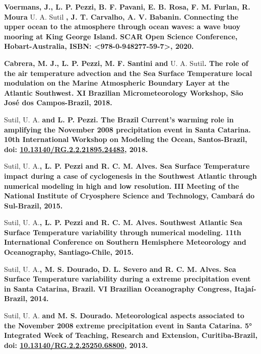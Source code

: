 \documentclass[letterpaper]{twentysecondcv} %
\begin{document}
\textbf{Voermans, J., L. P. Pezzi, B. F. Pavani, E. B. Rosa, F. M. Furlan, R. Moura} U. A. Sutil \textbf{, J. T. Carvalho, A. V. Babanin}\textbf{. Connecting the upper ocean to the atmosphere through ocean waves: a wave buoy mooring at King George Island. SCAR Open Science Conference, Hobart-Australia, ISBN: <978-0-948277-59-7>, 2020.} 

\textbf{Cabrera, M. J., L. P. Pezzi, M. F. Santini and} U. A. Sutil\textbf{. The role of the air temperature advection and the Sea Surface Temperature local modulation on the Marine Atmospheric Boundary Layer at the Atlantic Southwest. XI Brazilian Micrometeorology Workshop, São José dos Campos-Brazil, 2018.} 

Sutil, U. A.\textbf{ and L. P. Pezzi. The Brazil Current's warming role in amplifying the November 2008 precipitation event in Santa Catarina. 10th International Workshop on Modeling the Ocean, Santos-Brazil, doi: \textcolor{mainblue}{\href{https://www.researchgate.net/publication/329070547_Role_of_Brazil_Current_warming_in_amplifying_2008_Santa_Catarina_extreme_precipitation_event}{10.13140/RG.2.2.21895.24483}}, 2018.}

Sutil, U. A.\textbf{, L. P. Pezzi and R. C. M. Alves. Sea Surface Temperature impact during a case of cyclogenesis in the Southwest Atlantic through numerical modeling in high and low resolution. III Meeting of the National Institute of Cryosphere Science and Technology, Cambará do Sul-Brazil, 2015.}

Sutil, U. A.\textbf{, L. P. Pezzi and R. C. M. Alves. Southwest Atlantic Sea Surface Temperature variability through numerical modeling. 11th International Conference on Southern Hemisphere Meteorology and Oceanography, Santiago-Chile, 2015.}

Sutil, U. A.\textbf{, M. S. Dourado, D. L. Severo and R. C. M. Alves. Sea Surface Temperature variability during a extreme precipitation event in Santa Catarina, Brazil. VI Brazilian Oceanography Congress, Itajaí-Brazil, 2014.}

Sutil, U. A.\textbf{ and M. S. Dourado. Meteorological aspects associated to the November 2008 extreme precipitation event in Santa Catarina. 5° Integrated Week of Teaching, Research and Extension, Curitiba-Brazil, doi: \textcolor{mainblue}{\href{https://www.researchgate.net/publication/329070463_Aspectos_meteorologicos_associados_ao_evento_extremo_de_novembro_de_2008_no_leste_do_Estado_de_Santa_Catarina}{10.13140/RG.2.2.25250.68800}}, 2013.}
\\
\\\\
\end{document}
